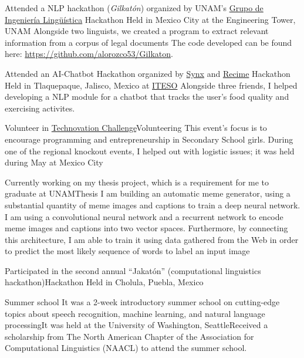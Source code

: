 \documentclass[11pt,a4paper,sans]{moderncv} %
\begin{document}
        {Attended a NLP hackathon (\emph{Gilkatón}) organized by UNAM's
          \href{http://grupos.iingen.unam.mx/iling/es-mx/Paginas/default.aspx}{Grupo de Ingeniería Lingüística}}
        {Hackathon}
        {Held in Mexico City at the Engineering Tower, UNAM}
        {Alongside two linguists, we created a program to extract relevant information
          from a corpus of legal documents}
        {The code developed can be found here: \url{https://github.com/alorozco53/Gilkaton}.}

        {Attended an AI-Chatbot Hackathon organized by \href{http://synx.co}{Synx} and \href{https://www.recime.io}{Recime}}
        {Hackathon}
        {Held in Tlaquepaque, Jalisco, Mexico at \href{http://www.iteso.mx}{ITESO}}{}
        {Alongside three friends, I helped developing a NLP module for a chatbot that tracks the user's food quality and exercising activites.}

        {Volunteer in \href{http://technovationmx.org}{Technovation Challenge}}{Volunteering}
        {This event's focus is to encourage programming and entrepreneurship in Secondary School girls. During one of the regional knockout events, I helped out with logistic issues; it was held during May at Mexico City}
        {}{}

        {Currently working on my thesis project, which is a requirement for me to graduate at UNAM}{Thesis}
        {I am building an automatic meme generator, using a substantial quantity of meme images and captions to train a deep neural network. I am using a convolutional neural network and a recurrent network to encode meme images and captions into two vector spaces. Furthermore, by connecting this architecture, I am able to train it using data gathered from the Web in order to predict the most likely sequence of words to label an input image}
        {}{}

        {Participated in the second annual ``Jakatón'' (computational linguistics hackathon)}{Hackathon}
        {Held in Cholula, Puebla, Mexico}{}{}

        {Summer school}
        {It was a 2-week introductory summer school on cutting-edge topics about speech recognition, machine learning, and natural language processing}{It was held at the University of Washington, Seattle}{Received a scholarship from The North American Chapter of the Association for Computational Linguistics (NAACL) to attend the summer school.}
\end{document}
